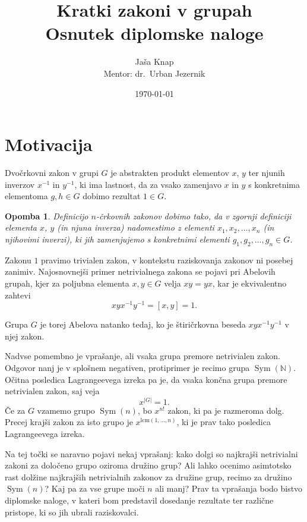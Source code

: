 \documentclass[12pt,a4paper]{article}
\title{Kratki zakoni v grupah \\ \large Osnutek diplomske naloge}
\author{Jaša Knap \\ \large Mentor: dr.~Urban Jezernik}
\date{\today}
\newcounter{theoremcounter}[section] %
\newtheorem{opomba}[theoremcounter]{Opomba}
\begin{document}
\maketitle

\section{Motivacija}

Dvočrkovni zakon v grupi $G$ je abstrakten produkt elementov $x$, $y$ ter njunih inverzov $x^{-1}$ in $y^{-1}$, ki ima lastnost, da za vsako zamenjavo $x$ in $y$ s konkretnima
elementoma $g, h \in G$ dobimo rezultat $1 \in G$. 

\begin{opomba}
Definicijo $n$-črkovnih zakonov dobimo tako, da v zgornji definiciji elementa $x$, $y$ (in njuna inverza) nadomestimo z elementi $x_1, x_2, \ldots, x_n$ (in njihovimi inverzi),
ki jih zamenjujemo s konkretnimi elementi $g_1, g_2, \ldots, g_{n} \in G$.
\end{opomba}

\noindent
Zakonu $1$ pravimo trivialen zakon, v kontekstu raziskovanja zakonov ni posebej zanimiv. Najosnovnejši primer netrivialnega zakona se pojavi pri Abelovih grupah, kjer za poljubna elementa $x,y \in  G$ velja $xy = yx$, kar je ekvivalentno
zahtevi \begin{equation*}
xyx^{-1}y^{-1} = [x,y] = 1.
\end{equation*}


\noindent
Grupa $G$ je torej Abelova natanko tedaj, ko je štiričrkovna beseda $xyx^{-1}y^{-1}$ v njej zakon. 

\noindent
Nadvse pomembno je vprašanje, ali vsaka grupa premore netrivialen zakon. Odgovor nanj je v splošnem negativen, protiprimer je recimo grupa $\operatorname{Sym}(\mathbb{N})$.
Očitna posledica Lagrangeevega izreka pa je, da vsaka končna grupa premore netrivialen zakon, saj veja \begin{equation*}
x^{\lvert G \rvert } = 1.
\end{equation*}  
Če za $G$ vzamemo grupo $\operatorname{Sym}(n)$, bo $x^{n!}$ zakon, ki pa je razmeroma dolg. Precej krajši zakon za isto grupo je $x^{\text{lcm}(1, \ldots, n)}$, ki je prav tako posledica Lagrangeevega izreka. 

\noindent
Na tej točki se naravno pojavi nekaj vprašanj:
kako dolgi so najkrajši netrivialni zakoni za določeno grupo oziroma družino grup? Ali lahko ocenimo asimtotsko rast dolžine najkrajših netrivialnih zakonov za družine grup, recimo za družino $\operatorname{Sym}(n)$? Kaj pa za vse grupe moči $n$ ali manj?  Prav ta vprašanja bodo bistvo diplomske naloge,
v kateri bom predstavil dosedanje rezultate ter različne pristope, ki so jih ubrali raziskovalci.
\end{document}
